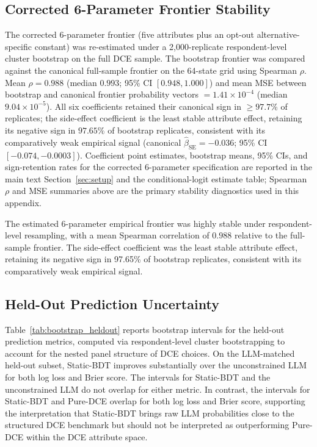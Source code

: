 \documentclass[11pt]{article}
\begin{document}
\subsection{Corrected 6-Parameter Frontier Stability}
\label{app:bootstrap_6param}

The corrected 6-parameter frontier (five attributes plus an opt-out alternative-specific constant) was re-estimated under a 2{,}000-replicate respondent-level cluster bootstrap on the full DCE sample. The bootstrap frontier was compared against the canonical full-sample frontier on the 64-state grid using Spearman $\rho$. Mean $\rho = 0.988$ (median $0.993$; 95\% CI $[0.948, 1.000]$) and mean MSE between bootstrap and canonical frontier probability vectors $= 1.41 \times 10^{-4}$ (median $9.04 \times 10^{-5}$). All six coefficients retained their canonical sign in $\geq 97.7\%$ of replicates; the side-effect coefficient is the least stable attribute effect, retaining its negative sign in $97.65\%$ of bootstrap replicates, consistent with its comparatively weak empirical signal (canonical $\hat{\beta}_{\text{SE}} = -0.036$; 95\% CI $[-0.074, -0.0003]$). Coefficient point estimates, bootstrap means, 95\% CIs, and sign-retention rates for the corrected 6-parameter specification are reported in the main text Section~\ref{sec:setup} and the conditional-logit estimate table; Spearman $\rho$ and MSE summaries above are the primary stability diagnostics used in this appendix.

The estimated 6-parameter empirical frontier was highly stable under respondent-level resampling, with a mean Spearman correlation of $0.988$ relative to the full-sample frontier. The side-effect coefficient was the least stable attribute effect, retaining its negative sign in 97.65\% of bootstrap replicates, consistent with its comparatively weak empirical signal.

\subsection{Held-Out Prediction Uncertainty}

Table~\ref{tab:bootstrap_heldout} reports bootstrap intervals for the held-out prediction metrics, computed via respondent-level cluster bootstrapping to account for the nested panel structure of DCE choices. On the LLM-matched held-out subset, Static-BDT improves substantially over the unconstrained LLM for both log loss and Brier score. The intervals for Static-BDT and the unconstrained LLM do not overlap for either metric. In contrast, the intervals for Static-BDT and Pure-DCE overlap for both log loss and Brier score, supporting the interpretation that Static-BDT brings raw LLM probabilities close to the structured DCE benchmark but should not be interpreted as outperforming Pure-DCE within the DCE attribute space.
\end{document}

